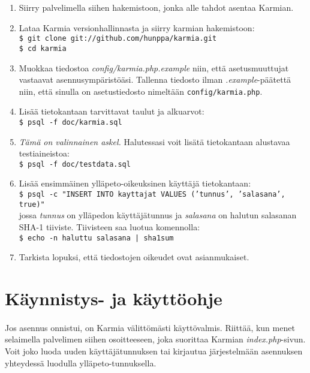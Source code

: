 \documentclass[11pt]{article}
\begin{document}
\begin{enumerate}
\item Siirry palvelimella siihen hakemistoon, jonka alle tahdot asentaa Karmian.
\item Lataa Karmia versionhallinnasta ja siirry karmian hakemistoon: \\
\texttt{\$ git clone git://github.com/hunppa/karmia.git} \\
\texttt{\$ cd karmia}
\item Muokkaa tiedostoa \emph{config/karmia.php.example} niin, että asetusmuuttujat vastaavat asennusympäristöäsi. Tallenna tiedosto ilman \emph{.example}-päätettä niin, että sinulla on asetustiedosto nimeltään \texttt{config/karmia.php}.
\item Lisää tietokantaan tarvittavat taulut ja alkuarvot: \\
\texttt{\$ psql -f doc/karmia.sql}
\item \emph{Tämä on valinnainen askel.} Halutessasi voit lisätä tietokantaan alustavaa testiaineistoa: \\
\texttt{\$ psql -f doc/testdata.sql}
\item Lisää ensimmäinen ylläpeto-oikeuksinen käyttäjä tietokantaan: \\
\texttt{\$ psql -c "INSERT INTO kayttajat VALUES ('tunnus', 'salasana', true)"} \\
jossa \emph{tunnus} on ylläpedon käyttäjätunnus ja \emph{salasana} on halutun salasanan SHA-1 tiiviste. Tiivisteen saa luotua komennolla: \\
\texttt{\$ echo -n haluttu salasana | sha1sum}
\item Tarkista lopuksi, että tiedostojen oikeudet ovat asianmukaiset.
\end{enumerate}


\section{Käynnistys- ja käyttöohje}

\paragraph{} Jos asennus onnistui, on Karmia välittömästi käyttövalmis. Riittää, kun menet selaimella palvelimen siihen osoitteeseen, joka suorittaa Karmian \mbox{\emph{index.php}}-sivun. Voit joko luoda uuden käyttäjätunnuksen tai kirjautua järjestelmään asennuksen yhteydessä luodulla ylläpeto-tunnuksella.
\end{document}
